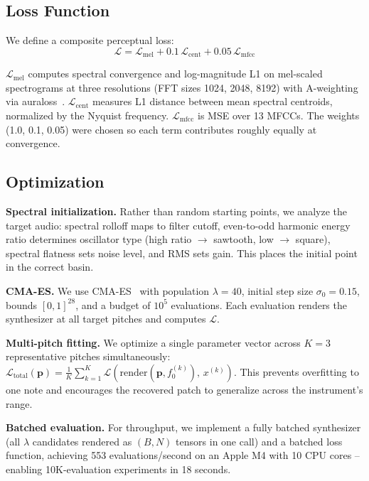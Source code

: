 \documentclass[10pt,twocolumn]{article}
\begin{document}
\subsection{Loss Function}

We define a composite perceptual loss:
\vspace{-1mm}
\begin{equation}
\mathcal{L} = \mathcal{L}_{\text{mel}} + 0.1\,\mathcal{L}_{\text{cent}} + 0.05\,\mathcal{L}_{\text{mfcc}}
\end{equation}
\vspace{-1mm}

$\mathcal{L}_{\text{mel}}$ computes spectral convergence and log-magnitude L1 on mel-scaled spectrograms at three resolutions (FFT sizes 1024, 2048, 8192) with A-weighting via auraloss~\cite{steinmetz2020auraloss}. $\mathcal{L}_{\text{cent}}$ measures L1 distance between mean spectral centroids, normalized by the Nyquist frequency. $\mathcal{L}_{\text{mfcc}}$ is MSE over 13 MFCCs. The weights (1.0, 0.1, 0.05) were chosen so each term contributes roughly equally at convergence.

\subsection{Optimization}

\textbf{Spectral initialization.} Rather than random starting points, we analyze the target audio: spectral rolloff maps to filter cutoff, even-to-odd harmonic energy ratio determines oscillator type (high ratio $\to$ sawtooth, low $\to$ square), spectral flatness sets noise level, and RMS sets gain. This places the initial point in the correct basin.

\textbf{CMA-ES.} We use CMA-ES~\cite{hansen2016cmaes} with population $\lambda{=}40$, initial step size $\sigma_0{=}0.15$, bounds $[0,1]^{28}$, and a budget of $10^5$ evaluations. Each evaluation renders the synthesizer at all target pitches and computes $\mathcal{L}$.

\textbf{Multi-pitch fitting.} We optimize a single parameter vector across $K{=}3$ representative pitches simultaneously: $\mathcal{L}_{\text{total}}(\mathbf{p}) = \frac{1}{K}\sum_{k=1}^{K}\mathcal{L}(\text{render}(\mathbf{p}, f_0^{(k)}),\, x^{(k)})$. This prevents overfitting to one note and encourages the recovered patch to generalize across the instrument's range.

\textbf{Batched evaluation.} For throughput, we implement a fully batched synthesizer (all $\lambda$ candidates rendered as $(B, N)$ tensors in one call) and a batched loss function, achieving 553 evaluations/second on an Apple M4 with 10 CPU cores -- enabling 10K-evaluation experiments in 18 seconds.
\end{document}
